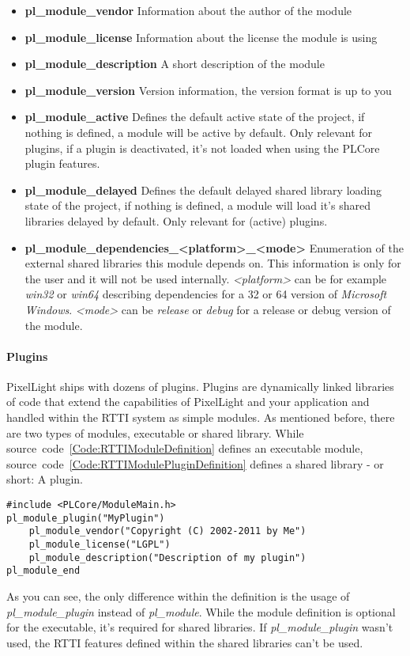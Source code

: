 \begin{itemize}
\item \textbf{pl\_module\_vendor} Information about the author of the module
\item \textbf{pl\_module\_license} Information about the license the module is using
\item \textbf{pl\_module\_description} A short description of the module
\item \textbf{pl\_module\_version} Version information, the version format is up to you
\item \textbf{pl\_module\_active} Defines the default active state of the project, if nothing is defined, a module will be active by default. Only relevant for plugins, if a plugin is deactivated, it's not loaded when using the PLCore plugin features.
\item \textbf{pl\_module\_delayed} Defines the default delayed shared library loading state of the project, if nothing is defined, a module will load it's shared libraries delayed by default. Only relevant for (active) plugins.
\item \textbf{pl\_module\_dependencies\_\textless platform\textgreater\_\textless mode\textgreater} Enumeration of the external shared libraries this module depends on. This information is only for the user and it will not be used internally. \emph{\textless platform\textgreater} can be for example \emph{win32} or \emph{win64} describing dependencies for a \SI{32}{\bit} or \SI{64}{\bit} version of \emph{Microsoft Windows}. \emph{\textless mode\textgreater} can be \emph{release} or \emph{debug} for a release or debug version of the module.
\end{itemize}


\paragraph{Plugins}
PixelLight ships with dozens of plugins. Plugins are dynamically linked libraries of code that extend the capabilities of PixelLight and your application and handled within the \ac{RTTI} system as simple modules. As mentioned before, there are two types of modules, executable or shared library. While source~code~\ref{Code:RTTIModuleDefinition} defines an executable module, source~code~\ref{Code:RTTIModulePluginDefinition} defines a shared library - or short: A plugin.
\begin{lstlisting}[float=htb,label=Code:RTTIModulePluginDefinition,caption={Defining a new \ac{RTTI} module plugin}]
#include <PLCore/ModuleMain.h>
pl_module_plugin("MyPlugin")
	pl_module_vendor("Copyright (C) 2002-2011 by Me")
	pl_module_license("LGPL")
	pl_module_description("Description of my plugin")
pl_module_end
\end{lstlisting}
As you can see, the only difference within the definition is the usage of \emph{pl\_module\_plugin} instead of \emph{pl\_module}. While the module definition is optional for the executable, it's required for shared libraries. If \emph{pl\_module\_plugin} wasn't used, the \ac{RTTI} features defined within the shared libraries can't be used.

